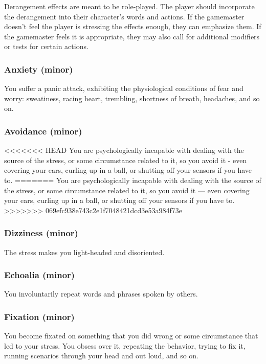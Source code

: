 Derangement effects are meant to be role-played. The player should incorporate the derangement into their character’s words and actions. If the gamemaster doesn’t feel the player is stressing the effects enough, they can emphasize them. If the gamemaster feels it is appropriate, they may also call for additional modifiers or tests for certain actions.

\subsubsection{Anxiety (minor)}

You suffer a panic attack, exhibiting the physiological conditions of fear and worry: sweatiness, racing heart, trembling, shortness of breath, headaches, and so on.

\subsubsection{Avoidance (minor)}

<<<<<<< HEAD
You are psychologically incapable with dealing with the source of the stress, or some circumstance related to it, so you avoid it - even covering your ears, curling up in a ball, or shutting off your sensors if you have to.
=======
You are psychologically incapable with dealing with the source of the stress, or some circumstance related to it, so you avoid it --- even covering your ears, curling up in a ball, or shutting off your sensors if you have to.
>>>>>>> 069efc938e743c2e1f7048421dcd3e53a984f73e

\subsubsection{Dizziness (minor)}

The stress makes you light-headed and disoriented.

\subsubsection{Echoalia (minor)}

You involuntarily repeat words and phrases spoken by others.

\subsubsection{Fixation (minor)}

You become fixated on something that you did wrong or some circumstance that led to your stress. You obsess over it, repeating the behavior, trying to fix it, running scenarios through your head and out loud, and so on.

